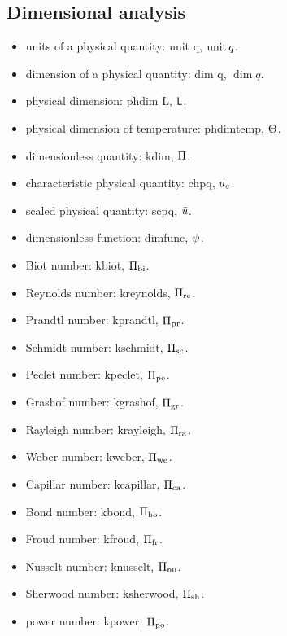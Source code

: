 \subsection{Dimensional analysis}
\begin{itemize}
\item units of a physical quantity: unit q, $\operatorname{unit} q$.
\item dimension of a physical quantity: dim q, $\dim q$.
\item physical dimension: phdim L, $\mathsf{L}$.
\item physical dimension of temperature: phdimtemp, $\Theta$.
\item dimensionless quantity: kdim, $\Pi$.
\item characteristic physical quantity: chpq, ${u}_{c}$.
\item scaled physical quantity: scpq, $\bar{u}$.
\item dimensionless function: dimfunc, $\psi$.
\item Biot number: kbiot, $\Pi_\text{bi}$.
\item Reynolds number: kreynolds, $\Pi_\text{re}$.
\item Prandtl number: kprandtl, $\Pi_\text{pr}$.
\item Schmidt number: kschmidt, $\Pi_\text{sc}$.
\item Peclet number: kpeclet, $\Pi_\text{pe}$.
\item Grashof number: kgrashof, $\Pi_\text{gr}$.
\item Rayleigh number: krayleigh, $\Pi_\text{ra}$.
\item Weber number: kweber, $\Pi_\text{we}$.
\item Capillar number: kcapillar, $\Pi_\text{ca}$.
\item Bond number: kbond, $\Pi_\text{bo}$.
\item Froud number: kfroud, $\Pi_\text{fr}$.
\item Nusselt number: knusselt, $\Pi_\text{nu}$.
\item Sherwood number: ksherwood, $\Pi_\text{sh}$.
\item power number: kpower, $\Pi_\text{po}$.
\end{itemize}
